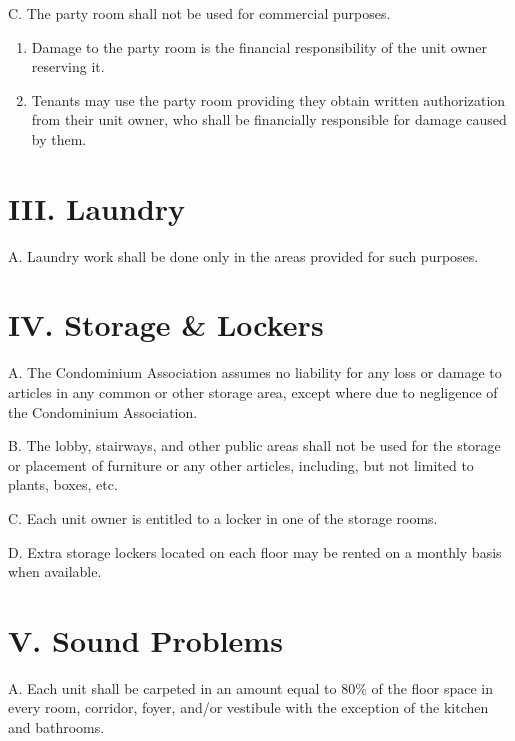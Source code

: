 \documentclass[
]{book}
\begin{document}
C. The party room shall not be used for commercial purposes.

\begin{enumerate}
\def\labelenumi{\arabic{enumi}.}
\item
  Damage to the party room is the financial responsibility of the unit owner reserving it.
\item
  Tenants may use the party room providing they obtain written authorization from their unit owner, who shall be financially responsible for damage caused by them.
\end{enumerate}

\hypertarget{iii.-laundry-2}{%
\section*{III. Laundry}\label{iii.-laundry-2}}

A. Laundry work shall be done only in the areas provided for such purposes.

\hypertarget{iv.-storage-lockers-2}{%
\section*{IV. Storage \& Lockers}\label{iv.-storage-lockers-2}}

A. The Condominium Association assumes no liability for any loss or damage to articles in any common or other storage area, except where due to negligence of the Condominium Association.

B. The lobby, stairways, and other public areas shall not be used for the storage or placement of furniture or any other articles, including, but not limited to plants, boxes, etc.

C. Each unit owner is entitled to a locker in one of the storage rooms.

D. Extra storage lockers located on each floor may be rented on a monthly basis when available.

\hypertarget{v.-sound-problems-2}{%
\section*{V. Sound Problems}\label{v.-sound-problems-2}}

A. Each unit shall be carpeted in an amount equal to 80\% of the floor space in every room, corridor, foyer, and/or vestibule with the exception of the kitchen and bathrooms.
\end{document}
